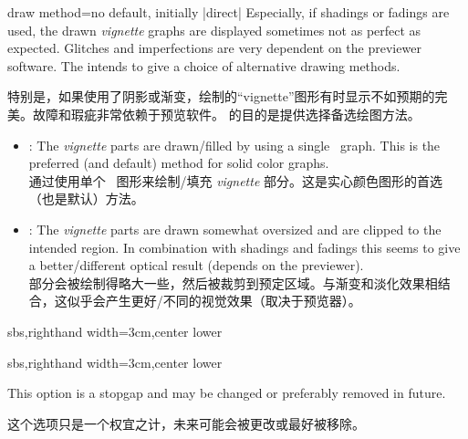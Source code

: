 \begin{vigTcbKey}[][doc new=2016-04-22]{draw method}{=\textbar{}}{no default, initially |direct|}
Especially, if shadings or fadings are used, the drawn \emph{vignette}
graphs are displayed sometimes not as perfect as expected. Glitches and
imperfections are very dependent on the previewer software.
The  intends to give a choice of alternative
drawing methods.

特别是，如果使用了阴影或渐变，绘制的“vignette”图形有时显示不如预期的完美。故障和瑕疵非常依赖于预览软件。  的目的是提供选择备选绘图方法。
\begin{itemize}
\item{}: The \emph{vignette} parts are drawn/filled
by using a single \tikzname\ graph. This is the preferred (and default)
method for solid color graphs.
\\通过使用单个 \tikzname\ 图形来绘制/填充 \emph{vignette} 部分。这是实心颜色图形的首选（也是默认）方法。
\item{}: The \emph{vignette} parts are drawn somewhat
oversized and are clipped to the intended region.
In combination with shadings and fadings this seems to give a
better/different optical result (depends on the previewer).
\\部分会被绘制得略大一些，然后被裁剪到预定区域。与渐变和淡化效果相结合，这似乎会产生更好/不同的视觉效果（取决于预览器）。
\end{itemize}
\begin{dispExample*}{sbs,righthand width=3cm,center lower}
\end{dispExample*}
\begin{dispExample*}{sbs,righthand width=3cm,center lower}
\end{dispExample*}

\begin{marker}
This option is a stopgap and may be changed or preferably removed in
future.

这个选项只是一个权宜之计，未来可能会被更改或最好被移除。
\end{marker}
\end{vigTcbKey}
